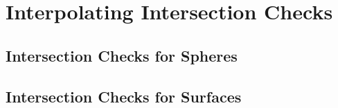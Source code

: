 \chapter{Interpolating Intersection Checks}

\section{Intersection Checks for Spheres}

\section{Intersection Checks for Surfaces}